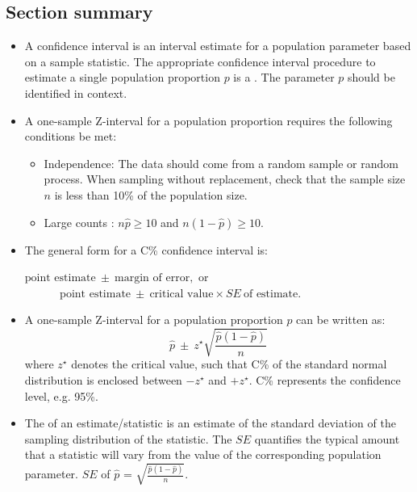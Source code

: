 \subsection*{Section summary}
\begin{itemize} 

\item A confidence interval is an interval estimate for a population parameter based on a sample statistic.  The appropriate confidence interval procedure to estimate a single population proportion $p$ is a .  The parameter $p$ should be identified in context.

\item A one-sample Z-interval for a population proportion requires the following conditions be met:
\begin{itemize}
\item[1.] Independence:  The data should come from a random sample or random process.  When sampling without replacement, check that the sample size $n$ is less than 10\% of the population size.
\item[2.] Large counts :  $n\hat{p}\ge 10$ and $n(1-\hat{p})\ge 10$.   
\end{itemize}

\item The general form for a C\% confidence interval is:
\begin{center}
$\text{point estimate}\ \pm\ \text{margin of error} , \text{ or } $\\
$\ \ \ \ \ \ \ \ \ \ \ \ \ \ \text{point estimate}\ \pm\ \text{critical value} \times SE\ \text{of estimate}. $
\end{center}
\item A one-sample Z-interval for a population proportion $p$ can be written as: 
$$\hat{p}\  \pm \  z^{\star}\sqrt{\frac{\hat{p}(1-\hat{p})}{n}}$$
where $z^{\star}$ denotes the critical value, such that C\% of the standard normal distribution is enclosed between $-z^{\star}$ and $+z^{\star}$.  C\% represents the confidence level, e.g. 95\%.


\item The  of an estimate/statistic is an estimate of the standard deviation of
the sampling distribution of the statistic.  The $SE$ quantifies the typical amount that a statistic will vary from the value of the corresponding population parameter.  $SE$ of $\hat{p}$ = $\sqrt{\frac{\hat{p}(1-\hat{p})}{n}}$.


\end{itemize}
